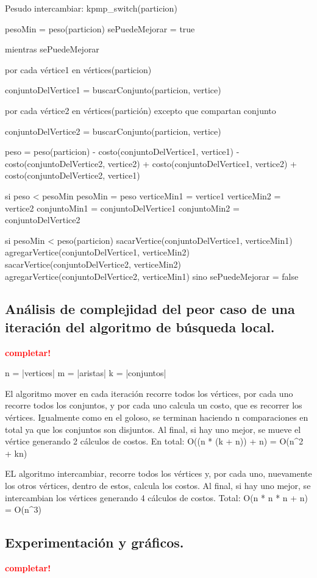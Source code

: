 Pesudo intercambiar:
kpmp_switch(particion) {
	pesoMin = peso(particion)
	sePuedeMejorar = true

	mientras sePuedeMejorar {
		por cada vértice1 en vértices(particion) {
			conjuntoDelVertice1 = buscarConjunto(particion, vertice)

			por cada vértice2 en vértices(partición) excepto que compartan conjunto {
				conjuntoDelVertice2 = buscarConjunto(particion, vertice)

				peso = peso(particion)
					- costo(conjuntoDelVertice1, vertice1)
					- costo(conjuntoDelVertice2, vertice2)
					+ costo(conjuntoDelVertice1, vertice2)
					+ costo(conjuntoDelVertice2, vertice1)


				si peso < pesoMin {
					pesoMin = peso
					verticeMin1 = vertice1
					verticeMin2 = vertice2
					conjuntoMin1 = conjuntoDelVertice1
					conjuntoMin2 = conjuntoDelVertice2
				}
			}
		}

		si pesoMin < peso(particion) {
			sacarVertice(conjuntoDelVertice1, verticeMin1)
			agregarVertice(conjuntoDelVertice1, verticeMin2)
			sacarVertice(conjuntoDelVertice2, verticeMin2)
			agregarVertice(conjuntoDelVertice2, verticeMin1)
		} sino {
			sePuedeMejorar = false
		}
	}
}

\newpage
\subsection{Análisis de complejidad del peor caso de una iteración del
            algoritmo de búsqueda local.}
\vspace*{0.3cm}
\textcolor{red}{\textbf{completar!}}

n = |vertices|
m = |aristas|
k = |conjuntos|

El algoritmo mover en cada iteración recorre todos los vértices, por cada uno
recorre todos los conjuntos, y por cada uno calcula un costo, que es recorrer
los vértices. Igualmente como en el goloso, se terminan haciendo n
comparaciones en total ya que los conjuntos son disjuntos.  Al final, si hay
uno mejor, se mueve el vértice generando 2 cálculos de costos.  En total: O((n
* (k + n)) + n) = O(n^2 + kn)

EL algoritmo intercambiar, recorre todos los vértices y, por cada uno,
nuevamente los otros vértices, dentro de estos, calcula los costos.  Al final,
si hay uno mejor, se intercambian los vértices generando 4 cálculos de costos.
Total: O(n * n * n + n) = O(n^3)

\newpage \subsection{Experimentación y gráficos.}
\vspace*{0.3cm}

\textcolor{red}{\textbf{completar!}}
